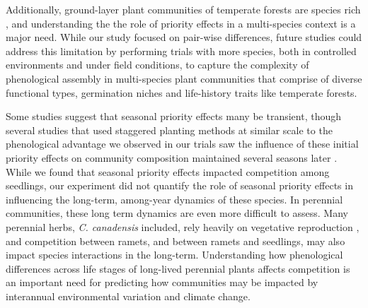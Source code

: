 \documentclass{article}[11pt]
\begin{document}
Additionally, ground-layer plant communities of temperate forests are species rich \citep{Whigham:2004wy}, and understanding the the role of priority effects in a multi-species context is a major need. While our study focused on pair-wise differences, future studies could address this limitation by performing trials with more species, both in controlled environments and under field conditions, to capture the complexity of phenological assembly in multi-species plant communities that comprise of diverse functional types, germination niches and life-history traits like temperate forests.

Some studies suggest that seasonal priority effects many be transient, though several studies that used staggered planting methods at similar scale to the phenological advantage we observed in our trials saw the influence of these initial priority effects on community composition maintained several seasons later \citep{Vaughn:2015wp,Young:2017aa,Torrez:2017to}. While we found that seasonal priority effects impacted competition among seedlings, our experiment did not quantify the role of seasonal priority effects in influencing the long-term, among-year dynamics of these species. %
 In perennial communities, these long term dynamics are even more difficult to assess. Many perennial herbs, \textit{C. canadensis} included, rely heavily on vegetative reproduction \citep{Hawkins:2005ve}, and competition between ramets, and between ramets and seedlings, may also impact species interactions in the long-term. %
Understanding how phenological differences across life stages of long-lived perennial plants affects competition is an important need for predicting how communities may be impacted by interannual environmental variation and climate change.  
\end{document}

